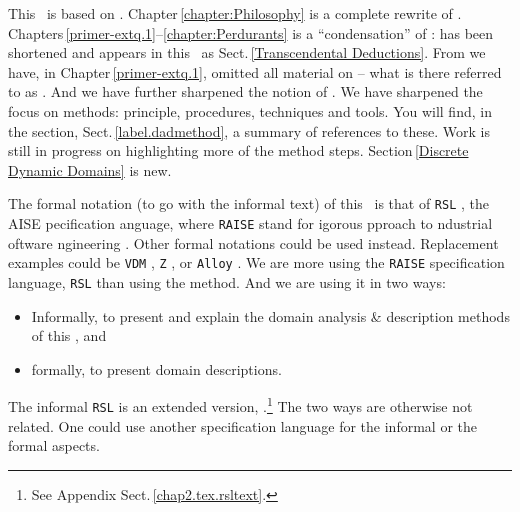 \begynd
\pind This \primer\ is based on \cite[Nov.\,2021]{BjornerMonograph2020}.
\pind Chapter\,\ref{chapter:Philosophy} is a complete rewrite of
      \cite[Chapter\,2]{BjornerMonograph2020}.  
\pind Chapters\,\ref{primer-extq.1}--\ref{chapter:Perdurants} is a
      ``condensation'' of \cite[Chapters\,4--7]{BjornerMonograph2020}:
\begynd
\pind \cite[Chapter\,6]{BjornerMonograph2020} has been shortened and
      appears in this \primer\ as Sect.\,\ref{Transcendental Deductions}.
\pind From \cite[Chapter\,4]{BjornerMonograph2020} we have, in
      Chapter\,\ref{primer-extq.1}, omitted all 
      material on -- what is there referred to as .
\pind And we have further sharpened the notion of .
\afslut
\pind We have sharpened the focus on methods: principle, procedures,
      techniques and tools.
\begynd
\pind You will find, in the  section,
      Sect.\,\vref{label.dadmethod}, a summary of references to these.
\pind Work is still in progress on highlighting more of the method steps.
\afslut
\pind Section\,\ref{Discrete Dynamic Domains} is new. 
\afslut

\label{RSL-I}

\begynd
\pind The formal notation (to go with the informal text) of this
      \primer\ is that of \texttt{RSL} \cite{RSL}, the AISE
      pecification anguage, where \texttt{RAISE}
      stand
      for igorous pproach to ndustrial
      oftware ngineering \cite{RaiseMethod}. 
\pind Other formal notations could be used instead.
\pind Replacement examples could be \texttt{VDM} \citevdm , \texttt{Z}
      \citez, or \texttt{Alloy} \citealloy.
\pind We are more using the \texttt{RAISE} specification language,
      \texttt{RSL} than using the method.
\pind And we are using it in two ways:
\begin{itemize}
\item Informally, to present and explain the domain analysis \&
      description methods of this \primer, and
\item formally, to present domain descriptions. 
\end{itemize}
\pind The informal \texttt{RSL} is an extended version,
\rslplus.\footnote{See Appendix Sect.\,\vref{chap2.tex.rsltext}.}
\pind The two ways are otherwise not related.
\pind One could use another specification language  for the
      informal or  the formal aspects.
\afslut

